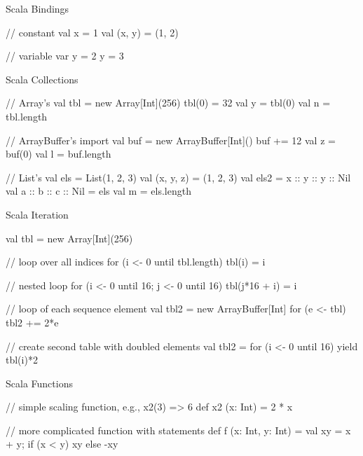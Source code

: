 \documentclass[xcolor=pdflatex,dvipsnames,table]{beamer}
\begin{document}
\begin{frame}[fragile]{Scala Bindings}
\begin{scala}
// constant
val x = 1
val (x, y) = (1, 2)

// variable
var y = 2
y = 3
\end{scala}
\end{frame}

\begin{frame}[fragile]{Scala Collections}
\begin{scala}
// Array's
val tbl = new Array[Int](256)
tbl(0) = 32
val y = tbl(0)
val n = tbl.length

// ArrayBuffer's
import 
val buf = new ArrayBuffer[Int]()
buf += 12
val z = buf(0)
val l = buf.length

// List's
val els = List(1, 2, 3)
val (x, y, z) = (1, 2, 3)
val els2 = x :: y :: y :: Nil
val a :: b :: c :: Nil = els
val m = els.length
\end{scala}
\end{frame}

\begin{frame}[fragile]{Scala Iteration}
\begin{scala}
val tbl = new Array[Int](256)

// loop over all indices
for (i <- 0 until tbl.length)
  tbl(i) = i

// nested loop
for (i <- 0 until 16; j <- 0 until 16)
  tbl(j*16 + i) = i

// loop of each sequence element
val tbl2 = new ArrayBuffer[Int]
for (e <- tbl)
  tbl2 += 2*e

// create second table with doubled elements
val tbl2 = for (i <- 0 until 16) yield tbl(i)*2
\end{scala}
\end{frame}

\begin{frame}[fragile]{Scala Functions}
\begin{scala}
// simple scaling function, e.g., x2(3) => 6
def x2 (x: Int) = 2 * x
\end{scala}

\begin{scala}
// more complicated function with statements
def f (x: Int, y: Int) = {
  val xy = x + y;
  if (x < y) xy else -xy
}
\end{scala}
\end{frame}
\end{document}
